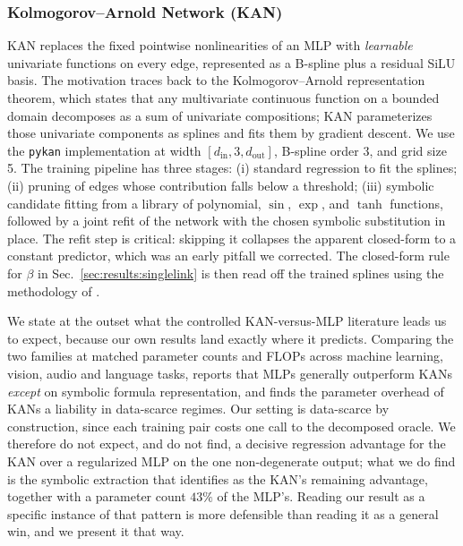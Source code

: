 \subsubsection{Kolmogorov--Arnold Network (KAN)}
KAN \cite{liu2024kan} replaces the fixed pointwise nonlinearities of an MLP with \emph{learnable} univariate functions on every edge, represented as a B-spline plus a residual SiLU basis. The motivation traces back to the Kolmogorov--Arnold representation theorem, which states that any multivariate continuous function on a bounded domain decomposes as a sum of univariate compositions; KAN parameterizes those univariate components as splines and fits them by gradient descent. We use the \texttt{pykan} \cite{liu2024kan2} implementation at width $[d_{\mathrm{in}}, 3, d_{\mathrm{out}}]$, B-spline order 3, and grid size 5. The training pipeline has three stages: (i) standard regression to fit the splines; (ii) pruning of edges whose contribution falls below a threshold; (iii) symbolic candidate fitting from a library of polynomial, $\sin$, $\exp$, and $\tanh$ functions, followed by a joint refit of the network with the chosen symbolic substitution in place. The refit step is critical: skipping it collapses the apparent closed-form to a constant predictor, which was an early pitfall we corrected. The closed-form rule for $\beta$ in Sec.~\ref{sec:results:singlelink} is then read off the trained splines using the methodology of \cite{cranmer2020discovering}.

We state at the outset what the controlled KAN-versus-MLP literature leads us to expect, because our own results land exactly where it predicts. Comparing the two families at matched parameter counts and FLOPs across machine learning, vision, audio and language tasks, \cite{yu2024fairer} reports that MLPs generally outperform KANs \emph{except} on symbolic formula representation, and \cite{pourkamali2024lowdata} finds the parameter overhead of KANs a liability in data-scarce regimes. Our setting is data-scarce by construction, since each training pair costs one call to the decomposed oracle. We therefore do not expect, and do not find, a decisive regression advantage for the KAN over a regularized MLP on the one non-degenerate output; what we do find is the symbolic extraction that \cite{yu2024fairer} identifies as the KAN's remaining advantage, together with a parameter count $43\%$ of the MLP's. Reading our result as a specific instance of that pattern is more defensible than reading it as a general win, and we present it that way.

